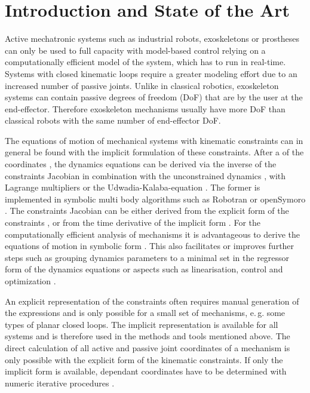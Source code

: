\documentclass{svproc}
\begin{document}
\section{Introduction and State of the Art}

Active mechatronic systems such as industrial robots, exoskeletons or prostheses can only be used to full capacity with model-based control relying on a computationally efficient model of the system, which has to run in real-time.
Systems with closed kinematic loops require a greater modeling effort due to an increased number of passive joints.
Unlike in classical robotics, exoskeleton systems can contain passive degrees of freedom (DoF) that are  by the user at the end-effector.
Therefore exoskeleton mechanisms usually have more DoF than classical robots with the same number of end-effector DoF.

The equations of motion of mechanical systems with kinematic constraints can in general be found with the implicit formulation of these constraints.
After a  of the coordinates \cite{WehageHau1982}, the dynamics equations can be derived via the inverse of the constraints Jacobian in combination with the unconstrained dynamics \cite{NakamuraGho1989}, with Lagrange multipliers \cite{WehageHau1982,LuhZhe1985} or the Udwadia-Kalaba-equation \cite{UdwadiaKal1992}.
The former is implemented in symbolic multi body algorithms such as Robotran \cite{SaminFis2013} or openSymoro \cite{KhalilVijKhoMuk2014}.
The constraints Jacobian can be either derived from the explicit form of the constraints \cite{NakamuraGho1989}, or from the time derivative of the implicit form \cite{ParkChoPlo1999}.
%
For the computationally efficient analysis of mechanisms it is advantageous to derive the equations of motion in symbolic form \cite{SaminFis2013}.
This also facilitates or improves further steps such as grouping dynamics parameters to a minimal set  in the regressor form of the dynamics equations \cite{KhalilBen1995} or aspects such as linearisation, control and optimization \cite{ParkChoPlo1999}.

An explicit representation of the constraints often requires manual generation of the expressions and is only possible for a small set of mechanisms, e.\,g. some types of planar closed loops.
The implicit representation is available for all systems and is therefore used in the methods and tools mentioned above.
%
The direct calculation of all active and passive joint coordinates of a mechanism is only possible with the explicit form of the kinematic constraints.
If only the implicit form is available, dependant coordinates have to be determined with numeric iterative procedures \cite{ParkChoPlo1999}.
\end{document}
